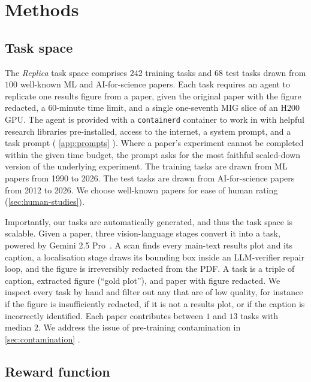 \documentclass[garamond,a4paper]{inherent}
\renewcommand{\sectionautorefname}{Section}%
\renewcommand{\subsectionautorefname}{Section}%
\renewcommand{\subsubsectionautorefname}{Section}%
\DeclareRobustCommand{\appref}[1]{%
  \begingroup
  \renewcommand{\sectionautorefname}{Appendix}%
  \renewcommand{\subsectionautorefname}{Appendix}%
  \renewcommand{\subsubsectionautorefname}{Appendix}%
  \autoref{#1}%
  \endgroup}
\newcommand{\replicaname}{Replica\xspace}
\begin{document}
\FloatBarrier
\newpage
\section{Methods}
\label{sec:methods}

\subsection{Task space}
\label{sec:replica}

The \textit{\replicaname} task space comprises $242$ training tasks and $68$ test tasks drawn from $100$ well-known ML and AI-for-science papers. Each task requires an agent to replicate one results figure from a paper, given the original paper with the figure redacted, a $60$-minute time limit, and a single one-seventh MIG slice of an H200 GPU. The agent is provided with a \texttt{containerd} container to work in with helpful research libraries pre-installed, access to the internet, a system prompt, and a task prompt (\appref{app:prompts}). Where a paper's experiment cannot be completed within the given time budget, the prompt asks for the most faithful scaled-down version of the underlying experiment. The training tasks are drawn from ML papers from 1990 to 2026. The test tasks are drawn from AI-for-science papers from 2012 to 2026. We choose well-known papers for ease of human rating (\autoref{sec:human-studies}).

Importantly, our tasks are automatically generated, and thus the task space is scalable.
Given a paper, three vision-language stages convert it into a task, powered by Gemini 2.5 Pro~\citep{comanici2025gemini}. 
A scan finds every main-text results plot and its caption, a localisation stage draws its bounding box inside an LLM-verifier repair loop, and the figure is irreversibly redacted from the PDF.
A task is a triple of caption, extracted figure (``gold plot''), and paper with figure redacted. We inspect every task by hand and filter out any that are of low quality, for instance if the figure is insufficiently redacted, if it is not a results plot, or if the caption is incorrectly identified.
Each paper contributes between $1$ and $13$ tasks with median $2$. We address the issue of pre-training contamination in \appref{sec:contamination}.

\subsection{Reward function}
\label{sec:reward}
\end{document}
